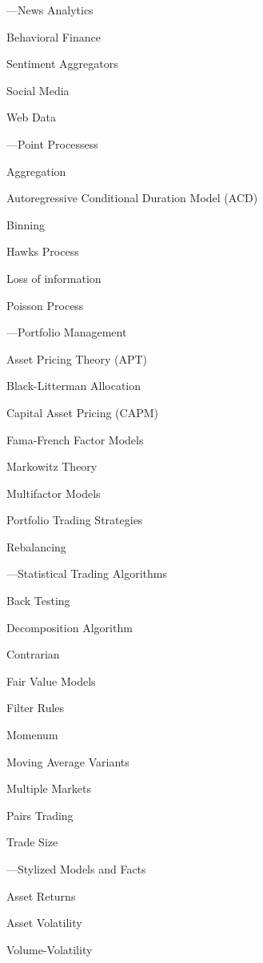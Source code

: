 %
\begin{minipage}{0.40\textwidth}
\noindent ---News Analytics
	\begin{flushright}
	Behavioral Finance \par
	Sentiment Aggregators \par
	Social Media \par
	Web Data 
	\end{flushright}

\noindent ---Point Processess
	\begin{flushright}
	Aggregation \par
	Autoregressive Conditional Duration Model (ACD) \par
	Binning \par
	Hawks Process \par
	Loss of information \par
	Poisson Process
	\end{flushright}

\noindent ---Portfolio Management 
	\begin{flushright}
	Asset Pricing Theory (APT) \par
	Black-Litterman Allocation \par 
	Capital Asset Pricing (CAPM) \par
	Fama-French Factor Models \par
	Markowitz Theory \par
	Multifactor Models \par
	Portfolio Trading Strategies \par
	Rebalancing
	\end{flushright}


\noindent ---Statistical Trading Algorithms
	\begin{flushright}
	Back Testing \par
	Decomposition Algorithm \par
	Contrarian \par
	Fair Value Models \par
	Filter Rules \par
	Momenum \par
	Moving Average Variants \par
	Multiple Markets \par
	Pairs Trading \par
	Trade Size 
	\end{flushright}


\noindent ---Stylized Models and Facts
	\begin{flushright}
	Asset Returns \par
	Asset Volatility \par
	Volume-Volatility 
	\end{flushright}
\end{minipage} \hfill
